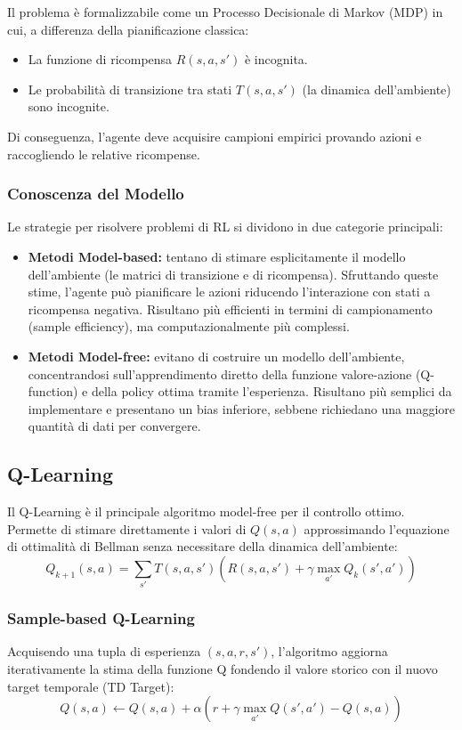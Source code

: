 \documentclass[12pt,a4paper]{article}
\begin{document}
\vspace{1em}
\noindent

Il problema è formalizzabile come un Processo Decisionale di Markov (MDP) in cui, a differenza della pianificazione classica:
\begin{itemize}
    \item La funzione di ricompensa \(R(s, a, s')\) è incognita.
    \item Le probabilità di transizione tra stati \(T(s, a, s')\) (la dinamica dell'ambiente) sono incognite.
\end{itemize}

Di conseguenza, l'agente deve acquisire campioni empirici provando azioni e raccogliendo le relative ricompense.

\subsubsection{Conoscenza del Modello}
Le strategie per risolvere problemi di RL si dividono in due categorie principali:
\begin{itemize}
    \item \textbf{Metodi Model-based:} tentano di stimare esplicitamente il modello dell'ambiente (le matrici di transizione e di ricompensa). Sfruttando queste stime, l'agente può pianificare le azioni riducendo l'interazione con stati a ricompensa negativa. Risultano più efficienti in termini di campionamento (sample efficiency), ma computazionalmente più complessi.
    \item \textbf{Metodi Model-free:} evitano di costruire un modello dell'ambiente, concentrandosi sull'apprendimento diretto della funzione valore-azione (Q-function) e della policy ottima tramite l'esperienza. Risultano più semplici da implementare e presentano un bias inferiore, sebbene richiedano una maggiore quantità di dati per convergere.
\end{itemize}

\subsection{Q-Learning}
Il Q-Learning è il principale algoritmo model-free per il controllo ottimo. Permette di stimare direttamente i valori di \(Q(s,a)\) approssimando l'equazione di ottimalità di Bellman senza necessitare della dinamica dell'ambiente:
\[Q_{k+1}(s,a) = \sum_{s'} T(s, a, s') \left( R(s, a, s') + \gamma \max_{a'} Q_k(s', a') \right)\]

\subsubsection{Sample-based Q-Learning}
Acquisendo una tupla di esperienza \((s, a, r, s')\), l'algoritmo aggiorna iterativamente la stima della funzione Q fondendo il valore storico con il nuovo target temporale (TD Target):
\[Q(s,a) \leftarrow Q(s,a) + \alpha \left( r + \gamma \max_{a'} Q(s', a') - Q(s,a) \right)\]
\end{document}
